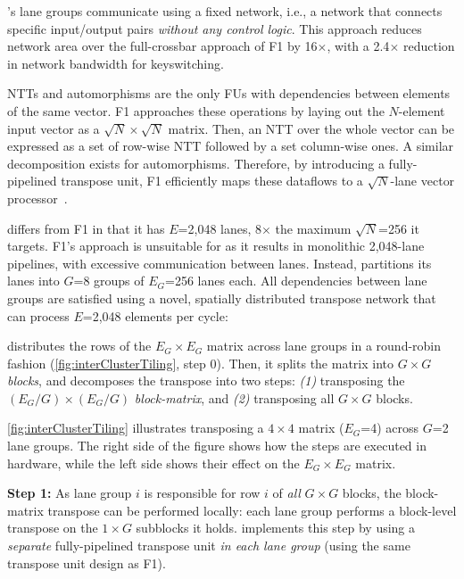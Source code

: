 \name's lane groups communicate using
a fixed network, i.e., a network that connects specific input/output pairs
\emph{without any control logic}. This approach reduces network area over
the full-crossbar approach of F1 by 16$\times$, with a 2.4$\times$ reduction in
network bandwidth for keyswitching.

NTTs and automorphisms are the only FUs with dependencies between elements of
the same vector.
F1 approaches these operations by laying out the $N$-element input vector as a
$\sqrt N \times \sqrt N$ matrix.
Then, an NTT over the whole vector can be expressed as a set of
row-wise NTT followed by a set column-wise ones.
A similar decomposition exists for automorphisms.
Therefore, by introducing a fully-pipelined transpose unit, F1 efficiently maps these
dataflows to a $\sqrt N$-lane vector processor~\cite{feldmann:micro21:f1}.

\name differs from F1 in that it has $E$=2,048 lanes, 8$\times$ the maximum $\sqrt{N}$=256 it targets.
F1's approach is unsuitable for \name as it results in monolithic 2,048-lane pipelines, 
with excessive communication between lanes.
Instead, \name partitions its lanes into $G$=8 groups of $E_G$=256 lanes each.
All dependencies between lane groups are satisfied using a novel,
spatially distributed transpose network that can process $E$=2,048
elements per cycle:

\figInterClusterTiling

\name distributes the rows of the $E_G\times E_G$ matrix across lane groups in
a round-robin fashion (\autoref{fig:interClusterTiling}, step 0).
Then, it splits the matrix into $G \times G$ \emph{blocks}, and decomposes
the transpose into two steps:
\emph{(1)} transposing the $(E_G/G) \times (E_G/G)$ \emph{block-matrix}, 
and \emph{(2)} transposing all $G\times G$ blocks.

\autoref{fig:interClusterTiling} illustrates transposing a
$4\times 4$ matrix ($E_G$=4) across $G$=2 lane groups.
The right side of the figure shows how the steps are executed in hardware, while the
left side shows their effect on the $E_G\times E_G$ matrix. 

\textbf{Step 1:} As lane group $i$ is responsible for row $i$ of \emph{all} $G \times G$
blocks, the block-matrix transpose can be performed locally:
each lane group performs a block-level transpose on the $1 \times G$ subblocks
it holds.
\name implements this step by using a \emph{separate} fully-pipelined transpose unit \emph{in each lane group}
(using the same transpose unit design as F1).

